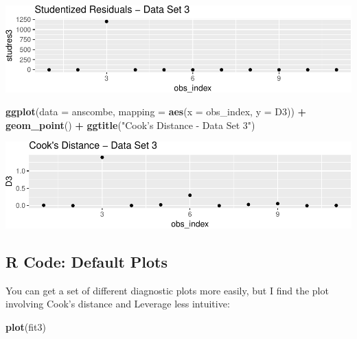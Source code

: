 \documentclass[]{extarticle}
\newenvironment{Shaded}{\begin{snugshade}}{\end{snugshade}}
\newcommand{\KeywordTok}[1]{\textcolor[rgb]{0.13,0.29,0.53}{\textbf{#1}}}
\newcommand{\DataTypeTok}[1]{\textcolor[rgb]{0.13,0.29,0.53}{#1}}
\newcommand{\StringTok}[1]{\textcolor[rgb]{0.31,0.60,0.02}{#1}}
\newcommand{\OperatorTok}[1]{\textcolor[rgb]{0.81,0.36,0.00}{\textbf{#1}}}
\newcommand{\NormalTok}[1]{#1}
\begin{document}
\includegraphics{20190417_residual_diagnostics_files/figure-latex/unnamed-chunk-14-2.pdf}

\begin{Shaded}
\begin{Highlighting}[]
\KeywordTok{ggplot}\NormalTok{(}\DataTypeTok{data =}\NormalTok{ anscombe, }\DataTypeTok{mapping =} \KeywordTok{aes}\NormalTok{(}\DataTypeTok{x =}\NormalTok{ obs_index, }\DataTypeTok{y =}\NormalTok{ D3)) }\OperatorTok{+}
\StringTok{  }\KeywordTok{geom_point}\NormalTok{() }\OperatorTok{+}
\StringTok{  }\KeywordTok{ggtitle}\NormalTok{(}\StringTok{"Cook's Distance - Data Set 3"}\NormalTok{)}
\end{Highlighting}
\end{Shaded}

\includegraphics{20190417_residual_diagnostics_files/figure-latex/unnamed-chunk-14-3.pdf}

\newpage

\subsection{R Code: Default Plots}\label{r-code-default-plots}

You can get a set of different diagnostic plots more easily, but I find
the plot involving Cook's distance and Leverage less intuitive:

\begin{Shaded}
\begin{Highlighting}[]
\KeywordTok{plot}\NormalTok{(fit3)}
\end{Highlighting}
\end{Shaded}
\end{document}
